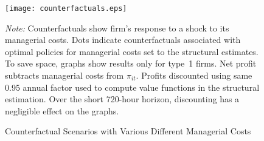 \documentclass[11pt]{article}
\begin{document}
\clearpage

\begin{figure}
\centering
\caption{\label{f:counterfactuals}Counterfactual Scenarios with Various Different Managerial Costs}
\vspace{5ex}
\texttt{[image: counterfactuals.eps]}\\[5ex]
\parbox{\textwidth}{\footnotesize {\em Note:} Counterfactuals show
  firm's response to a shock to its managerial costs. Dots indicate
  counterfactuals associated with optimal policies for managerial
  costs set to the structural estimates.  To save space, graphs show
  results only for type~1 firms.  Net profit subtracts managerial
  costs from $\pi_{it}$. Profits discounted using same 0.95 annual
  factor used to compute value functions in the structural
  estimation. Over the short 720-hour horizon, discounting has a
  negligible effect on the graphs.}
\end{figure}
\end{document}
